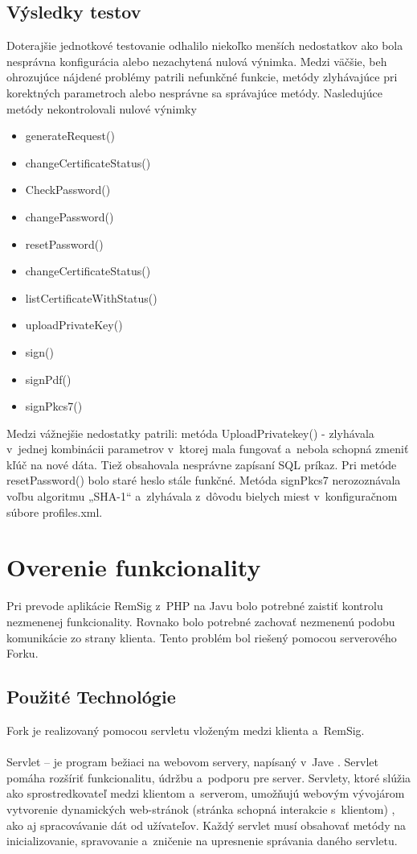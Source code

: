 \documentclass[
  digital, %
  table,   %
oneside,
  nolof,     %
  nolot,     %
]{fithesis3}
\begin{document}
\subsection{Výsledky testov}
Doterajšie jednotkové testovanie odhalilo niekoľko menších nedostatkov ako bola nesprávna konfigurácia alebo nezachytená nulová výnimka. Medzi väčšie, beh ohrozujúce nájdené problémy patrili nefunkčné funkcie, metódy zlyhávajúce pri korektných parametroch alebo nesprávne sa správajúce metódy.  
Nasledujúce metódy nekontrolovali nulové výnimky 

\begin{itemize}

\item generateRequest()
\item changeCertificateStatus()
\item CheckPassword()
\item changePassword()
\item resetPassword()
\item changeCertificateStatus()
\item listCertificateWithStatus()
\item uploadPrivateKey()
\item sign()
\item signPdf()
\item signPkcs7()
 \end{itemize}


Medzi vážnejšie nedostatky patrili: metóda UploadPrivatekey() - zlyhávala v~jednej kombinácii parametrov v~ktorej mala fungovať a~nebola schopná zmeniť kľúč na nové dáta. Tiež obsahovala nesprávne zapísaní SQL príkaz. Pri metóde resetPassword() bolo staré heslo stále funkčné. Metóda signPkcs7 nerozoznávala voľbu algoritmu „SHA-1“ a~zlyhávala z~dôvodu bielych miest v~konfiguračnom súbore profiles.xml. 



\section{Overenie funkcionality}
Pri prevode aplikácie RemSig z~PHP na Javu bolo potrebné zaistiť kontrolu nezmenenej funkcionality. Rovnako bolo potrebné zachovať nezmenenú podobu komunikácie zo strany klienta. Tento problém bol riešený pomocou serverového Forku.
\subsection{Použité Technológie}
Fork je realizovaný pomocou servletu vloženým medzi klienta a~RemSig.\paragraph{}
Servlet – je program bežiaci na webovom servery, napísaný v~Jave \cite{servlet}. Servlet pomáha rozšíriť  funkcionalitu, údržbu a~podporu pre server. Servlety, ktoré slúžia ako sprostredkovateľ medzi klientom a~serverom,  umožňujú webovým vývojárom vytvorenie dynamických web-stránok (stránka schopná interakcie s~klientom) \cite{staticVsDynamic}, ako aj spracovávanie dát od užívateľov. Každý servlet musí obsahovať metódy na inicializovanie, spravovanie a~zničenie na upresnenie správania daného servletu.
\end{document}
